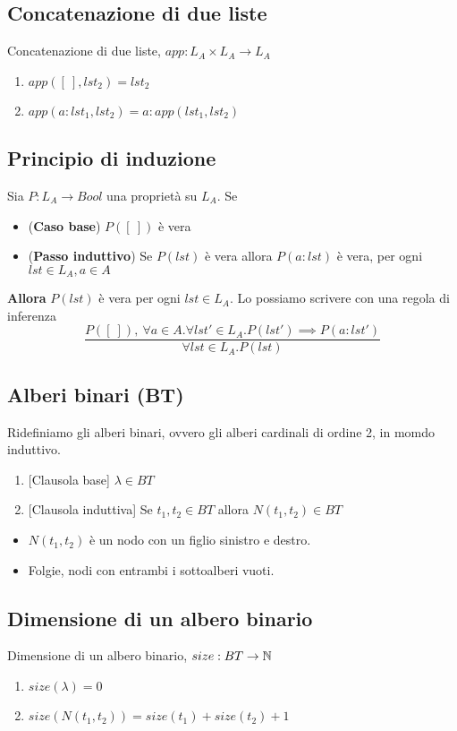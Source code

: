 \documentclass{article}
\begin{document}
\subsection*{Concatenazione di due liste}
Concatenazione di due liste, \(app: L_A \times L_A \rightarrow L_A\)
\begin{enumerate}
    \item \(app([\ ], lst_2) = lst_2\)
    \item \(app(a: lst_1, lst_2) = a: app(lst_1, lst_2)\)
\end{enumerate}
\subsection*{Principio di induzione}
Sia \(P: L_A \rightarrow Bool\) una proprietà su \(L_A\). Se
\begin{itemize}
    \item (\textbf{Caso base}) \(P([\ ])\) è vera
    \item (\textbf{Passo induttivo}) Se \(P(lst)\) è vera allora \(P(a: lst)\) è vera, per ogni \(lst \in L_A, a \in A\)
\end{itemize}
\textbf{Allora} \(P(lst)\) è vera per ogni \(lst \in L_A\). Lo possiamo scrivere con una regola di inferenza
\[\frac{
        P([\ ]),\ \forall a \in A . \forall lst' \in L_A . P(lst') \implies P(a: lst')
    }{
        \forall lst \in L_A . P(lst)
    }
\]

\subsection{Alberi binari (BT)}
Ridefiniamo gli alberi binari, ovvero gli alberi cardinali di ordine 2, in momdo induttivo.
\begin{enumerate}
    \item {[Clausola base]} \(\lambda \in BT\)
    \item {[Clausola induttiva]} Se \(t_1, t_2 \in BT\) allora \(N(t_1, t_2)\in BT\)
\end{enumerate}
\begin{itemize}
    \item \(N(t_1, t_2)\) è un nodo con un figlio sinistro e destro.
    \item Folgie, nodi con entrambi i sottoalberi vuoti.
\end{itemize}
\subsection*{Dimensione di un albero binario}
Dimensione di un albero binario, \(size: BT \rightarrow \mathbb{N}\)
\begin{enumerate}
    \item \(size(\lambda) = 0\)
    \item \(size(N(t_1,t_2)) = size(t_1) + size(t_2) + 1\)
\end{enumerate}
\end{document}
